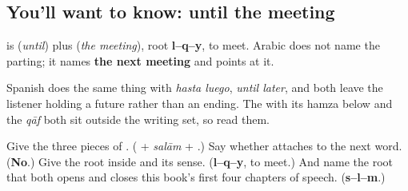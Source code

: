 \subsection*{You'll want to know: until the meeting}
\textbf{ } is \textbf{} (\emph{until}) plus \textbf{} (\emph{the meeting}), root \textbf{l–q–y}, to meet. Arabic does not name the parting; it names \textbf{the next meeting} and points at it.

Spanish does the same thing with \emph{hasta luego}, \emph{until later}, and both leave the listener holding a future rather than an ending. The \textbf{} with its hamza below and the \textbf{} \emph{qāf} both sit outside the writing set, so read them.

\begin{tcolorbox}[breakable,colback=teal!4,colframe=teal!35!black,title={Before you move on}]
Give the three pieces of \textbf{}. (\textbf{} + \emph{salām} + \textbf{}.) Say whether \textbf{} attaches to the next word. (\textbf{No}.) Give the root inside \textbf{} and its sense. (\textbf{l–q–y}, to meet.) And name the root that both opens and closes this book's first four chapters of speech. (\textbf{s–l–m}.)
\end{tcolorbox}
